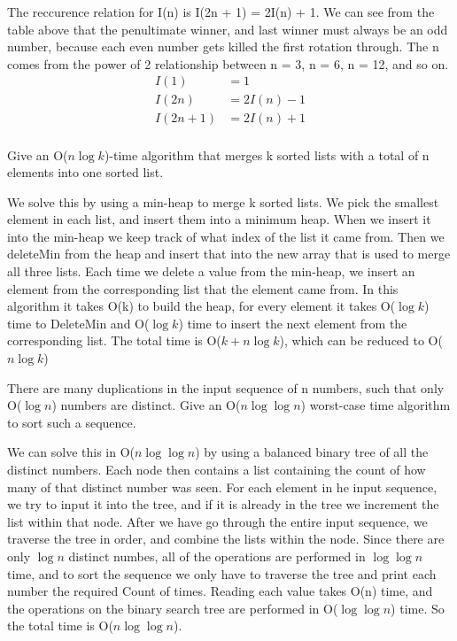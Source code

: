 \documentclass[10pt]{article}
\newenvironment{exercise}[2][Exercise]{\begin{trivlist}
\item[\hskip \labelsep {\bfseries #1}\hskip \labelsep {\bfseries #2.}]}{\end{trivlist}}
\newenvironment{solution}[2][Solution]{\begin{trivlist}
\item[\hskip \labelsep {\bfseries #1}\hskip \labelsep {\bfseries #2.}]}{\end{trivlist}}
\theoremstyle{definition}
\begin{document}
\begin{solution}{(1b)}
The reccurence relation for I(n) is  I(2n + 1) = 2I(n) + 1. We can see from the table above that the penultimate winner, and last winner must always be an odd number, because each even number gets killed the first rotation through. The n comes from the power of 2 relationship between n = 3, n = 6, n = 12, and so on.
\begin{align*}
I(1) & = 1\\
I(2n) & = 2I(n) - 1\\
I(2n + 1) & = 2I(n) + 1\\
\end{align*}
\end{solution}
 
\begin{exercise}{(2)} %
Give an O($n \log{k}$)-time algorithm that merges k sorted lists with a total of n elements into
one sorted list.
\end{exercise}

\begin{solution}{(2)}
We solve this by using a min-heap to merge k sorted lists. We pick the smallest element in each list, and insert them into a minimum heap. When we insert it into the min-heap we keep track of what index of the list it came from. Then we deleteMin from the heap and insert that into the new array that is used to merge all three lists. Each time we delete a value from the min-heap, we insert an element from the corresponding list that the element came from. In this algorithm it takes O(k) to build the heap, for every element it takes O($\log{k}$) time to DeleteMin and O($\log{k}$) time to insert the next element from the corresponding list. The total time is O($k + n\log{k}$), which can be reduced to O($n\log{k}$)
\end{solution}

\begin{exercise}{(3)} 
There are many duplications in the input sequence of n numbers, such that only O($\log{n}$) numbers are distinct. Give an O($n \log{\log{n}}$) worst-case time algorithm to sort such a sequence.
\end{exercise}

\begin{solution}{(3)}
We can solve this in O($n \log{\log{n}}$)  by using a balanced binary tree of all the distinct numbers. Each node then contains a list containing the count of how many of that distinct number was seen. For each element in he input sequence, we try to input it into the tree, and if it is already in the tree we increment the list within that node. After we have go through the entire input sequence, we traverse the tree in order, and combine the lists within the node. Since there are only $\log{n}$ distinct numbes, all of the operations are performed in $\log{\log{n}}$ time, and to sort the sequence we only have to traverse the tree and print each number the required Count of times. Reading each value takes O(n) time, and the operations on the binary search tree are performed in O($\log{\log{n}}$) time. So the total time is O($n\log{\log{n}}$).
\end{solution}
\end{document}
